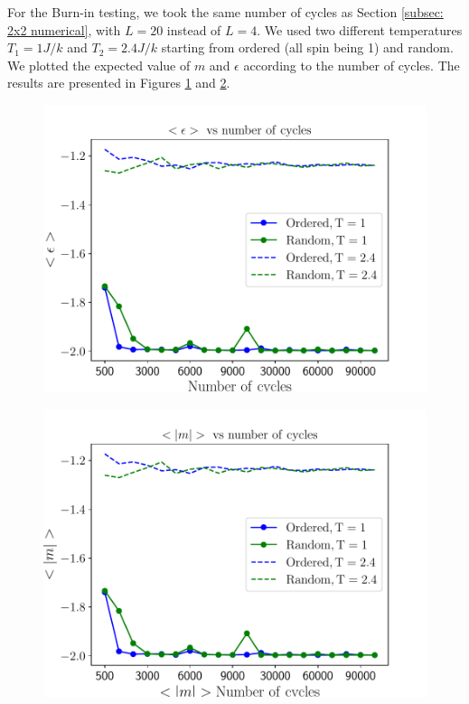 \documentclass[english,notitlepage,reprint,nofootinbib]{revtex4-2}  %
\begin{document}
	For the Burn-in testing, we took the same number of cycles as Section \ref{subsec: 2x2 numerical},
	with $L=20$ instead of $L=4$. We used two different temperatures $T_1=1 J/k$ and $T_2=2.4 J/k$
	starting from ordered (all spin being 1) and random. We plotted the expected value of $m$ and $\epsilon$ according to the number of cycles. The results are presented in
	Figures \ref{fig:eps5} and \ref{fig:m5}.

	\begin{figure}[h!]
		\centering
		\includegraphics[scale=0.55]{figures/epsilon_problem5.pdf}
		\caption{}
		\label{fig:eps5}
	\end{figure}
	\begin{figure}[h!]
		\centering
		\includegraphics[scale=0.55]{figures/m_problem5}
		\caption{}
		\label{fig:m5}
	\end{figure}
\end{document}
